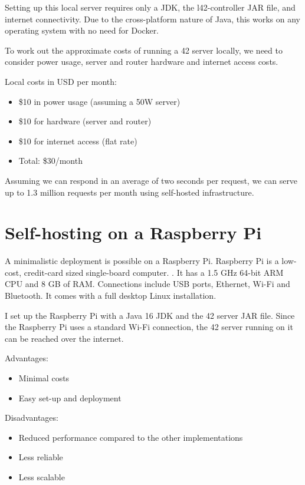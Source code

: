Setting up this local server requires only a JDK, the l42-controller JAR file, and internet connectivity. Due to the cross-platform nature of Java, this works on any operating system with no need for Docker.

To work out the approximate costs of running a 42 server locally, we need to consider power usage, server and router hardware and internet access costs.

Local costs in USD per month:

\begin{itemize}
\item \$10 in power usage (assuming a 50W server)
\item \$10 for hardware (server and router)
\item \$10 for internet access (flat rate)
\item Total: \$30/month
\end{itemize}

Assuming we can respond in an average of two seconds per request, we can serve up to 1.3 million requests per month using self-hosted infrastructure.

\section{Self-hosting on a Raspberry Pi}

A minimalistic deployment is possible on a Raspberry Pi. Raspberry Pi is a low-cost, credit-card sized single-board computer. \cite{raspberry-pi-foundation-2015}. It has a 1.5 GHz 64-bit ARM CPU and 8 GB of RAM. Connections include USB ports, Ethernet, Wi-Fi and Bluetooth. It comes with a full desktop Linux installation.

I set up the Raspberry Pi with a Java 16 JDK and the 42 server JAR file. Since the Raspberry Pi uses a standard Wi-Fi connection, the 42 server running on it can be reached over the internet.


Advantages:

\begin{itemize}
\item Minimal costs
\item Easy set-up and deployment
\end{itemize}

Disadvantages:

\begin{itemize}
\item Reduced performance compared to the other implementations
\item Less reliable
\item Less scalable
\end{itemize}

